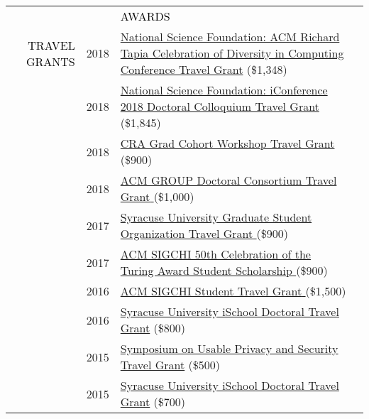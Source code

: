 \documentclass[12pt]{article}
\begin{document}
{{\begin{longtable}{Rp{1.0in}p{0.25in}p{4.75in}}
&&\par \Large \textcolor{black}{\uppercase{Awards}}\\ \hhline{~~-}

\textcolor{black}{\footnotesize{\uppercase{Travel Grants}}} & \footnotesize{2018} & \href{https://www.nsf.gov/awardsearch/showAward?AWD_ID=1823052}{{National Science Foundation: ACM Richard Tapia Celebration of Diversity in Computing Conference Travel Grant}} (\$1,348) \\

& \footnotesize{2018} & \href{https://www.nsf.gov/awardsearch/showAward?AWD_ID=1713738}{{National Science Foundation: iConference 2018 Doctoral Colloquium Travel Grant}} (\$1,845) \\

& \footnotesize{2018} & \href{https://cra.org/events/urmgradcohort/}{{CRA Grad Cohort Workshop Travel Grant} }(\$900) \\

& \footnotesize{2018} & \href{https://dl.acm.org/citation.cfm?id=3148330}{{ACM GROUP Doctoral Consortium Travel Grant} }(\$1,000) \\

& \footnotesize{2017} & \href{http://gradorg.syr.edu/}{{Syracuse University Graduate Student Organization Travel Grant} }(\$900) \\

& \footnotesize{2017} & \href{http://www.sigchi.org/news/sigchi-sponsors-students-to-attend-turing-award-celebration}{{ACM SIGCHI 50th Celebration of the Turing Award Student Scholarship} }(\$900) \\

& \footnotesize{2016} & \href{http://www.sigchi.org/conferences/funding/student-travel-grant}{{ACM SIGCHI Student Travel Grant} }(\$1,500) \\

& \footnotesize{2016} & \href{https://ischool.syr.edu/research/grants-and-awards/}{{Syracuse University iSchool Doctoral Travel Grant}} (\$800) \\

& \footnotesize{2015} & \href{http://cups.cs.cmu.edu/soups/2015/cfp.php}{{Symposium on Usable Privacy and Security Travel Grant}} (\$500) \\

& \footnotesize{2015} & \href{https://ischool.syr.edu/research/grants-and-awards/}{{Syracuse University iSchool Doctoral Travel Grant}} (\$700) \\


\end{longtable}}}
\end{document}
